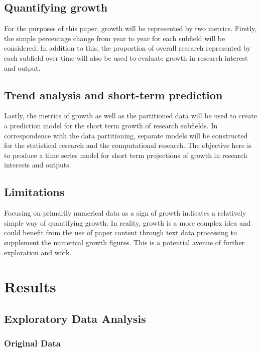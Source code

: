 \documentclass[
  12pt]{article}
\begin{document}
\subsection{Quantifying growth}\label{quantifying-growth}

For the purposes of this paper, growth will be represented by two
metrics. Firstly, the simple percentage change from year to year for
each subfield will be considered. In addition to this, the proportion of
overall research represented by each subfield over time will also be
used to evaluate growth in research interest and output.

\subsection{Trend analysis and short-term
prediction}\label{trend-analysis-and-short-term-prediction}

Lastly, the metrics of growth as well as the partitioned data will be
used to create a prediction model for the short term growth of research
subfields. In correspondence with the data partitioning, separate models
will be constructed for the statistical research and the computational
research. The objective here is to produce a time series model for short
term projections of growth in research interests and outputs.

\subsection{Limitations}\label{limitations}

Focusing on primarily numerical data as a sign of growth indicates a
relatively simple way of quantifying growth. In reality, growth is a
more complex idea and could benefit from the use of paper content
through text data processing to supplement the numerical growth figures.
This is a potential avenue of further exploration and work.

\section{Results}\label{sec-results}

\subsection{Exploratory Data Analysis}\label{exploratory-data-analysis}

\subsubsection{Original Data}\label{original-data}
\end{document}
